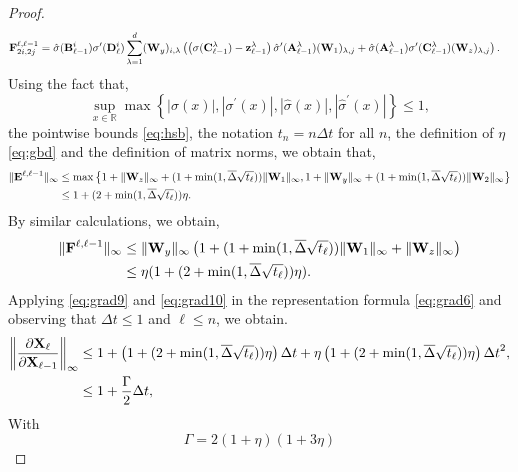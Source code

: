 \documentclass{article} \usepackage{iclr2022_conference,times}
\newcommand{\bz}{{\bf z}}
\newcommand{\bW}{{\bf W}}
\newcommand{\bA}{{\bf A}}
\newcommand{\bX}{{\bf X}}
\newcommand{\bB}{{\bf B}}
\newcommand{\bC}{{\bf C}}
\newcommand{\R}{{\mathbb R}}
\newcommand{\Dt}{{\Delta t}}
\newcommand{\bdel}{\overline{\Delta}}
\newcommand{\bF}{{\bf F}}
\newcommand{\bD}{{\bf D}}
\newcommand{\bE}{{\bf E}}
\begin{document}
\begin{proof}
\begin{equation}
\begin{aligned}
   \bF^{\ell,\ell-1}_{2i,2j} &= \hat{\sigma}(\bB^i_{\ell-1})\sigma^{\prime}(\bD^i_\ell)\sum\limits_{\lambda=1}^d (\bW_y)_{i,\lambda} \left(\left(\sigma(\bC^\lambda_{\ell-1})-\bz^{\lambda}_{\ell-1}\right)\hat{\sigma}^{\prime}(\bA^{\lambda}_{\ell-1})(\bW_1)_{\lambda,j} + \hat{\sigma}(\bA^{\lambda}_{\ell-1})\sigma^{\prime}(\bC^{\lambda}_{\ell-1})(\bW_z)_{\lambda,j}\right)  .
    \end{aligned}
\end{equation}
Using the fact that,
$$
\sup\limits_{x\in \R} \max\left\{|\sigma(x)|,|\sigma^{\prime}(x)|,|\hat{\sigma}(x)|,|\hat{\sigma}^\prime(x)|\right\} \leq 1,
$$
the pointwise bounds \eqref{eq:hsb}, the notation $t_n= n \Dt$ for all $n$, the definition of $\eta$ \eqref{eq:gbd} and the definition of matrix norms, we obtain that,
\begin{equation}
    \label{eq:grad9}
    \begin{aligned}
    \|\bE^{\ell,\ell-1}\|_{\infty} &\leq \max \left\{1 + \|\bW_z\|_{\infty}+(1+\min(1,\bdel\sqrt{t_\ell})) \|\bW_1\|_{\infty}, 1 + \|\bW_y\|_{\infty}+(1+\min(1,\bdel\sqrt{t_\ell}))\|\bW_2\|_{\infty} \right\} \\
    &\leq 1 + (2+\min(1,\bdel\sqrt{t_\ell}))\eta. 
    \end{aligned}
\end{equation}
By similar calculations, we obtain,
\begin{equation}
    \label{eq:grad10}
    \begin{aligned}
    \|\bF^{\ell,\ell-1}\|_{\infty} &\leq \|\bW_y\|_{\infty}\left(1 + (1+\min(1,\bdel\sqrt{t_\ell})) \|\bW_1\|_{\infty}+ \|\bW_z\|_{\infty}\right) \\
    &\leq \eta(1 + (2+\min(1,\bdel\sqrt{t_\ell}))\eta). 
    \end{aligned}
\end{equation}
Applying \eqref{eq:grad9} and \eqref{eq:grad10} in the representation formula \eqref{eq:grad6} and observing that $\Dt \leq 1$ and $\ell \leq n$, we obtain.
\begin{align*}
   \left \| \frac{\partial \bX_\ell}{\partial \bX_{\ell-1}}\right\|_{\infty} &\leq 1 +   \left(1 + (2+\min(1,\bdel\sqrt{t_\ell}))\eta\right)\Dt+ \eta\left(1 + (2+\min(1,\bdel\sqrt{t_\ell}))\eta\right)\Dt^2, \\
   &\leq 1 + \frac{\Gamma}{2}\Dt, 
\end{align*}
With 
\begin{equation}
    \label{eq:gm}
    \Gamma = 2\left(1 + \eta\right)(1 + 3 \eta) \end{equation}


\end{proof}
\end{document}
